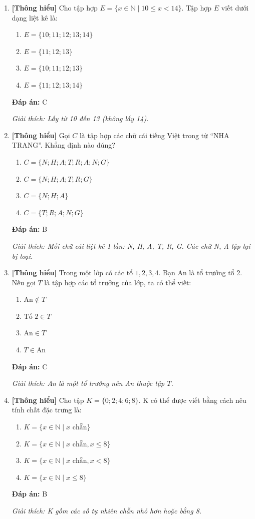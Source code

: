 \documentclass[12pt,a4paper]{article}
\newcommand{\thonghieu}{\textcolor{thonghieu}{\textbf{[Thông hiểu]}}}
\newcommand{\dapan}[1]{\par\smallskip\textbf{Đáp án:} #1}
\newcommand{\giaithich}[1]{\par\textit{Giải thích: #1}}
\begin{document}
\begin{enumerate}[label=\textbf{Câu \arabic*.}]
    \item \thonghieu{} Cho tập hợp $E = \{x \in \mathbb{N} \mid 10 \le x < 14\}$. Tập hợp $E$ viết dưới dạng liệt kê là:
    \begin{enumerate}[label=\Alph*.]
        \item $E = \{10; 11; 12; 13; 14\}$
        \item $E = \{11; 12; 13\}$
        \item $E = \{10; 11; 12; 13\}$
        \item $E = \{11; 12; 13; 14\}$
    \end{enumerate}
    \dapan{C}
    \giaithich{Lấy từ 10 đến 13 (không lấy 14).}

    \item \thonghieu{} Gọi $C$ là tập hợp các chữ cái tiếng Việt trong từ ``NHA TRANG''. Khẳng định nào đúng?
    \begin{enumerate}[label=\Alph*.]
        \item $C = \{N; H; A; T; R; A; N; G\}$
        \item $C = \{N; H; A; T; R; G\}$
        \item $C = \{N; H; A\}$
        \item $C = \{T; R; A; N; G\}$
    \end{enumerate}
    \dapan{B}
    \giaithich{Mỗi chữ cái liệt kê 1 lần: N, H, A, T, R, G. Các chữ N, A lặp lại bị loại.}

    \item \thonghieu{} Trong một lớp có các tổ $1, 2, 3, 4$. Bạn An là tổ trưởng tổ 2. Nếu gọi $T$ là tập hợp các tổ trưởng của lớp, ta có thể viết:
    \begin{enumerate}[label=\Alph*.]
        \item $\text{An} \notin T$
        \item $\text{Tổ 2} \in T$
        \item $\text{An} \in T$
        \item $T \in \text{An}$
    \end{enumerate}
    \dapan{C}
    \giaithich{An là một tổ trưởng nên An thuộc tập $T$.}

    \item \thonghieu{} Cho tập $K = \{0; 2; 4; 6; 8\}$. K có thể được viết bằng cách nêu tính chất đặc trưng là:
    \begin{enumerate}[label=\Alph*.]
        \item $K = \{x \in \mathbb{N} \mid x \text{ chẵn}\}$
        \item $K = \{x \in \mathbb{N} \mid x \text{ chẵn}, x \le 8\}$
        \item $K = \{x \in \mathbb{N} \mid x \text{ chẵn}, x < 8\}$
        \item $K = \{x \in \mathbb{N} \mid x \le 8\}$
    \end{enumerate}
    \dapan{B}
    \giaithich{K gồm các số tự nhiên chẵn nhỏ hơn hoặc bằng 8.}


\end{enumerate}
\end{document}
